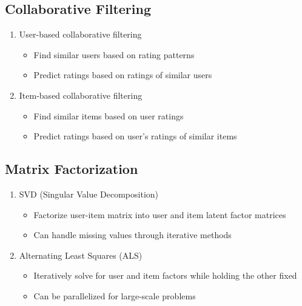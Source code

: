 \documentclass{article}
\begin{document}
\subsection{Collaborative Filtering}
\begin{enumerate}
    \item User-based collaborative filtering
    \begin{itemize}
        \item Find similar users based on rating patterns
        \item Predict ratings based on ratings of similar users
    \end{itemize}
    
    \item Item-based collaborative filtering
    \begin{itemize}
        \item Find similar items based on user ratings
        \item Predict ratings based on user's ratings of similar items
    \end{itemize}
\end{enumerate}

\subsection{Matrix Factorization}
\begin{enumerate}
    \item SVD (Singular Value Decomposition)
    \begin{itemize}
        \item Factorize user-item matrix into user and item latent factor matrices
        \item Can handle missing values through iterative methods
    \end{itemize}
    
    \item Alternating Least Squares (ALS)
    \begin{itemize}
        \item Iteratively solve for user and item factors while holding the other fixed
        \item Can be parallelized for large-scale problems
    \end{itemize}
\end{enumerate}
\end{document}
